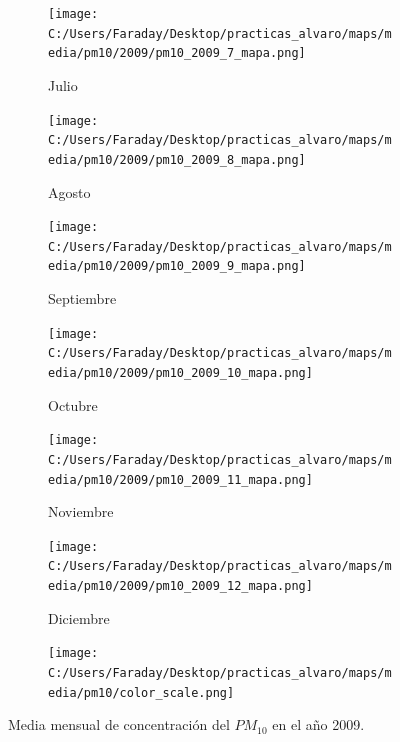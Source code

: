 \documentclass[12pt]{article}
\begin{document}
\begin{figure}[H]
\begin{subfigure}[H]{0.15\textwidth}
\texttt{[image: C:/Users/Faraday/Desktop/practicas\_alvaro/maps/media/pm10/2009/pm10\_2009\_7\_mapa.png]}
\captionsetup{labelformat=empty}
\caption{Julio}
\label{fig:map-pm10-2009-7}
\end{subfigure}
%
\begin{subfigure}[H]{0.15\textwidth}
\texttt{[image: C:/Users/Faraday/Desktop/practicas\_alvaro/maps/media/pm10/2009/pm10\_2009\_8\_mapa.png]}
\captionsetup{labelformat=empty}
\caption{Agosto}
\label{fig:map-pm10-2009-8}
\end{subfigure}
%
\begin{subfigure}[H]{0.15\textwidth}
\texttt{[image: C:/Users/Faraday/Desktop/practicas\_alvaro/maps/media/pm10/2009/pm10\_2009\_9\_mapa.png]}
\captionsetup{labelformat=empty}
\caption{Septiembre}
\label{fig:map-pm10-2009-9}
\end{subfigure}
%
\begin{subfigure}[H]{0.15\textwidth}
\texttt{[image: C:/Users/Faraday/Desktop/practicas\_alvaro/maps/media/pm10/2009/pm10\_2009\_10\_mapa.png]}
\captionsetup{labelformat=empty}
\caption{Octubre}
\label{fig:map-pm10-2009-10}
\end{subfigure}
%
\begin{subfigure}[H]{0.15\textwidth}
\texttt{[image: C:/Users/Faraday/Desktop/practicas\_alvaro/maps/media/pm10/2009/pm10\_2009\_11\_mapa.png]}
\captionsetup{labelformat=empty}
\caption{Noviembre}
\label{fig:map-pm10-2009-11}
\end{subfigure}
%
\begin{subfigure}[H]{0.15\textwidth}
\texttt{[image: C:/Users/Faraday/Desktop/practicas\_alvaro/maps/media/pm10/2009/pm10\_2009\_12\_mapa.png]}
\captionsetup{labelformat=empty}
\caption{Diciembre}
\label{fig:map-pm10-2009-12}
\end{subfigure}

\begin{subfigure}[H]{0.45\textwidth}
\texttt{[image: C:/Users/Faraday/Desktop/practicas\_alvaro/maps/media/pm10/color\_scale.png]}
\captionsetup{labelformat=empty}
\caption{}
\end{subfigure}

\vspace*{-7mm}
\caption{Media mensual de concentración del $PM_{10}$ en el año 2009.}
\label{fig:map-pm10-2009}
\end{figure}
\end{document}
